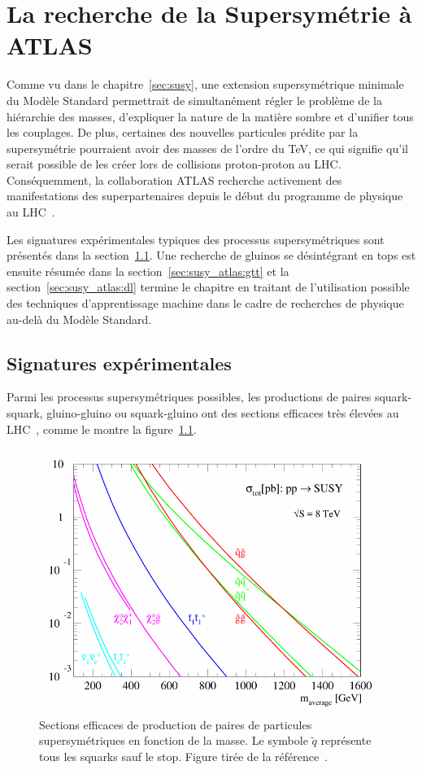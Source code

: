 \singlespacing{}
\chapter{La recherche de la Supersymétrie à ATLAS}
\label{sec:susy_atlas}
\doublespacing{}

Comme vu dans le chapitre~\ref{sec:susy}, une extension
supersymétrique minimale du Modèle Standard permettrait de
simultanément régler le problème de la hiérarchie des masses,
d'expliquer la nature de la matière sombre et d'unifier tous les
couplages. De plus, certaines des nouvelles particules prédite par la
supersymétrie pourraient avoir des masses de l'ordre du TeV, ce qui
signifie qu'il serait possible de les créer lors de collisions
proton-proton au LHC. Conséquemment, la collaboration ATLAS recherche
activement des manifestations des superpartenaires depuis le début du
programme de physique au LHC~\cite{aad_summary_2015}. 

Les signatures expérimentales typiques des processus supersymétriques
sont présentés dans la section~\ref{sec:susy_atlas:signatures}. Une
recherche de gluinos se désintégrant en tops est ensuite résumée dans
la section~\ref{sec:susy_atlas:gtt} et la
section~\ref{sec:susy_atlas:dl} termine le chapitre en traitant de
l'utilisation possible des techniques d'apprentissage machine dans le
cadre de recherches de physique au-delà du Modèle Standard.

\section{Signatures expérimentales}
\label{sec:susy_atlas:signatures}

Parmi les processus supersymétriques possibles, les productions de
paires squark-squark, gluino-gluino ou squark-gluino ont des sections
efficaces très élevées au LHC~\cite{olive_susy2_2014}, comme le montre
la figure~\ref{fig:susy_xsec}.

\begin{figure}
  \centering
  \includegraphics[width=.5\textwidth]{susy_xsec.pdf}
  \caption{Sections efficaces de production de paires de particules
    supersymétriques en fonction de la masse. Le symbole $\tilde{q}$
    représente tous les squarks sauf le stop. Figure tirée de la
    référence~\cite{olive_susy2_2014}.}
  \label{fig:susy_xsec}
\end{figure}

